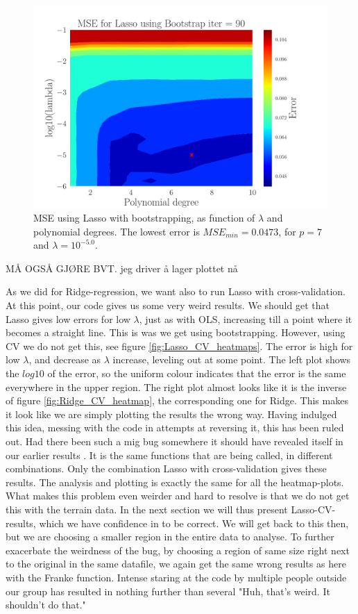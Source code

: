 \documentclass[reprint,english,notitlepage,aps,nobalancelastpage,nofootinbib]{revtex4-1}  %
\begin{document}
\begin{figure}[h]
	\includegraphics[width=\linewidth]{Contour_PL_Lasso_Bootstrap90_n30_eps0.2_p1_10_lmbm1_m6.pdf}
	\caption{MSE using Lasso with bootstrapping, as function of $\lambda$ and polynomial degrees. The lowest error is $MSE_{min}=0.0473$, for $p=7$ and $\lambda = 10^{-5.0}$.}
	\label{fig:Lasso_boot_heatmap}
\end{figure}

MÅ OGSÅ GJØRE BVT. jeg driver å lager plottet nå

As we did for Ridge-regression, we want also to run Lasso with cross-validation. At this point, our code gives us some very weird results. We should get that Lasso gives low errors for low $\lambda$, just as with OLS, increasing till a point where it becomes a straight line. This is was we get using bootstrapping. However, using CV we do not get this, see figure \ref{fig:Lasso_CV_heatmaps}. The error is high for low $\lambda$, and decrease as $\lambda$ increase, leveling out at some point. The left plot shows the $log10$ of the error, so the uniform colour indicates that the error is the same everywhere in the upper region. The right plot almost looks like it is the inverse of figure \ref{fig:Ridge_CV_heatmap}, the corresponding one for Ridge. This makes it look like we are simply plotting the results the wrong way. Having indulged this idea, messing with the code in attempts at reversing it, this has been ruled out. Had there been such a mig bug somewhere it should have revealed itself in our earlier results . It is the same functions that are being called, in different combinations. Only the combination Lasso with cross-validation gives these results. The analysis and plotting is exactly the same for all the heatmap-plots. What makes this problem even weirder and hard to resolve is that we do not get this with the terrain data. In the next section we will thus present Lasso-CV-results, which we have confidence in to be correct. We will get back to this then, but we are choosing a smaller region in the entire data to analyse. To further exacerbate the weirdness of the bug, by choosing a region of same size right next to the original in the same datafile, we again get the same wrong results as here with the Franke function. Intense staring at the code by multiple people outside our group has resulted in nothing further than several "Huh, that's weird. It shouldn't do that."
\end{document}
